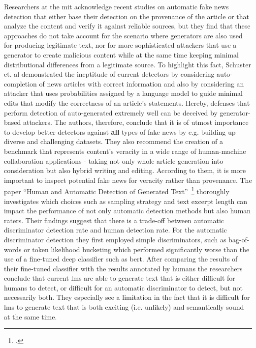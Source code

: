 Researchers at the \gls{mit} acknowledge recent studies on automatic fake news detection that either base their detection on the provenance of the article or that analyze the content and verify it against reliable sources, but they find that these approaches do not take account for the scenario where generators are also used for producing legitimate text, nor for more sophisticated attackers that use a generator to create malicious content while at the same time keeping minimal distributional differences from a legitimate source. To highlight this fact, Schuster et. al demonstrated the ineptitude of current detectors by considering auto-completion of news articles with correct information and also by considering an attacker that uses probabilities assigned by a language model to guide minimal edits that modify the correctness of an article's statements. Hereby, defenses that perform detection of auto-generated extremely well can be deceived by generator-based attackers. The authors, therefore, conclude that it is of utmost importance to develop better detectors against \textbf{all} types of fake news by e.g. building up diverse and challenging datasets. They also recommend the creation of a benchmark that represents content's veracity in a wide range of human-machine collaboration applications - taking not only whole article generation into consideration but also hybrid writing and editing. According to them, it is more important to inspect potential fake news for veracity rather than provenance.
The paper ``Human and Automatic Detection of Generated Text''~\footcite{ippolito2019human} thoroughly investigates which choices such as sampling strategy and text excerpt length can impact the performance of not only automatic detection methods but also human raters. Their findings suggest that there is a trade-off between automatic discriminator detection rate and human detection rate. For the automatic discriminator detection they first employed simple discriminators, such as bag-of-words or token likelihood bucketing which performed significantly worse than the use of a fine-tuned deep classifier such as \gls{bert}. After comparing the results of their fine-tuned classifier with the results annotated by humans the researchers conclude that current \gls{lm}s are able to generate text that is either difficult for humans to detect, or difficult for an automatic discriminator to detect, but not necessarily both. They especially see a limitation in the fact that it is difficult for \gls{lm}s to generate text that is both exciting (i.e. unlikely) and semantically sound at the same time.
